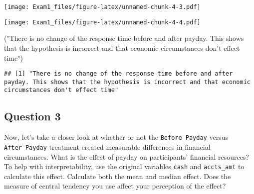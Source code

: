 \documentclass[
]{article}
\newenvironment{Shaded}{\begin{snugshade}}{\end{snugshade}}
\newcommand{\DataTypeTok}[1]{\textcolor[rgb]{0.13,0.29,0.53}{#1}}
\newcommand{\KeywordTok}[1]{\textcolor[rgb]{0.13,0.29,0.53}{\textbf{#1}}}
\newcommand{\NormalTok}[1]{#1}
\newcommand{\OperatorTok}[1]{\textcolor[rgb]{0.81,0.36,0.00}{\textbf{#1}}}
\newcommand{\StringTok}[1]{\textcolor[rgb]{0.31,0.60,0.02}{#1}}
\begin{document}
\texttt{[image: Exam1\_files/figure-latex/unnamed-chunk-4-3.pdf]}

\begin{Shaded}
\end{Shaded}

\texttt{[image: Exam1\_files/figure-latex/unnamed-chunk-4-4.pdf]}

\begin{Shaded}
\begin{Highlighting}[]
\NormalTok{(}\StringTok{"There is no change of the response time before and after payday. This shows that the hypothesis is incorrect and that economic circumstances don't effect time"}\NormalTok{) }
\end{Highlighting}
\end{Shaded}

\begin{verbatim}
## [1] "There is no change of the response time before and after payday. This shows that the hypothesis is incorrect and that economic circumstances don't effect time"
\end{verbatim}

\hypertarget{question-3}{%
\subsection{Question 3}\label{question-3}}

Now, let's take a closer look at whether or not the
\texttt{Before\ Payday} versus \texttt{After\ Payday} treatment created
measurable differences in financial circumstances. What is the effect of
payday on participants' financial resources? To help with
interpretability, use the original variables \texttt{cash} and
\texttt{accts\_amt} to calculate this effect. Calculate both the mean
and median effect. Does the measure of central tendency you use affect
your perception of the effect?
\end{document}
